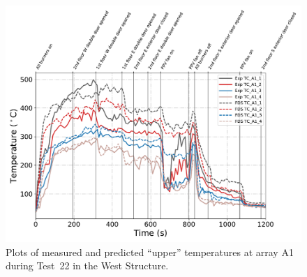 

\begin{figure}[!h]
	\centering
	\includegraphics[width=\columnwidth]{Figures/Plots/Validation/Temperature/Test_22_TC_A1_upper}
	\caption{Plots of measured and predicted ``upper'' temperatures at array A1 during Test~22 in the West Structure.}
	\label{fig:TCA1_upper_data_Test22}
\end{figure}

